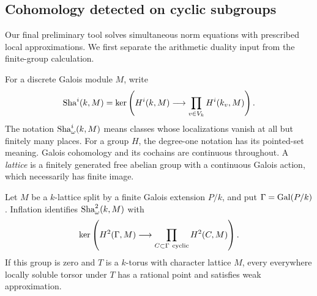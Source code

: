 \subsection{Cohomology detected on cyclic subgroups}

Our final preliminary tool solves simultaneous norm equations with
prescribed local approximations.  We first separate the arithmetic
duality input from the finite-group calculation.

For a discrete Galois module \(M\), write
\[
 \operatorname{Sha}^i(k,M)=
 \ker\left(H^i(k,M)\longrightarrow\prod_{v\in V_k}H^i(k_v,M)\right).
\]
The notation \(\operatorname{Sha}_\omega^i(k,M)\) means classes whose localizations
vanish at all but finitely many places.  For a group \(H\), the
degree-one notation has its pointed-set meaning.  Galois cohomology
and its cochains are continuous throughout.
A \emph{lattice} is a finitely generated free abelian group with a
continuous Galois action, which necessarily has finite image.

\begin{lemma}\label{lem:foundations-cyclic-detection}
Let \(M\) be a \(k\)-lattice split by a finite Galois extension
\(P/k\), and put \(\Gamma=\operatorname{Gal}(P/k)\).  Inflation identifies
\(\operatorname{Sha}_\omega^2(k,M)\) with
\[
 \ker\left(
 H^2(\Gamma,M)\longrightarrow
             \prod_{C\subset\Gamma\ {\rm cyclic}}H^2(C,M)
 \right).
\]
If this group is zero and \(T\) is a \(k\)-torus with character
lattice \(M\), every everywhere locally soluble torsor under \(T\)
has a rational point and satisfies weak approximation.
\end{lemma}

